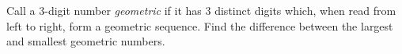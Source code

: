 Call a $ 3$-digit number \textit{geometric} if it has $ 3$ distinct digits which, when read from left to right, form a geometric sequence.  Find the difference between the largest and smallest geometric numbers.